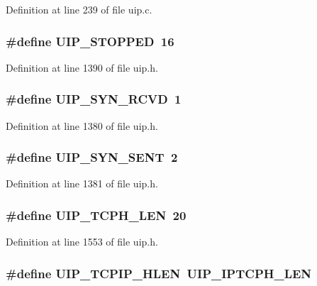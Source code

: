 Definition at line 239 of file uip.c.

\hypertarget{group__uip_gade29ec025e6754afd8cc24c954a8dec8}{
\subsubsection[{UIP\_\-STOPPED}]{\setlength{\rightskip}{0pt plus 5cm}\#define UIP\_\-STOPPED~16}}
\label{group__uip_gade29ec025e6754afd8cc24c954a8dec8}


Definition at line 1390 of file uip.h.

\hypertarget{group__uip_gaa5e3c856b86725125d19fccc34cd9eb5}{
\subsubsection[{UIP\_\-SYN\_\-RCVD}]{\setlength{\rightskip}{0pt plus 5cm}\#define UIP\_\-SYN\_\-RCVD~1}}
\label{group__uip_gaa5e3c856b86725125d19fccc34cd9eb5}


Definition at line 1380 of file uip.h.

\hypertarget{group__uip_ga8af482dec973db57d8b3bd3f69461488}{
\subsubsection[{UIP\_\-SYN\_\-SENT}]{\setlength{\rightskip}{0pt plus 5cm}\#define UIP\_\-SYN\_\-SENT~2}}
\label{group__uip_ga8af482dec973db57d8b3bd3f69461488}


Definition at line 1381 of file uip.h.

\hypertarget{group__uip_ga17d111686f98e4c09db73a770ac3f1a4}{
\subsubsection[{UIP\_\-TCPH\_\-LEN}]{\setlength{\rightskip}{0pt plus 5cm}\#define UIP\_\-TCPH\_\-LEN~20}}
\label{group__uip_ga17d111686f98e4c09db73a770ac3f1a4}


Definition at line 1553 of file uip.h.

\hypertarget{group__uip_gaee37386b2ab828787c05227eb109def7}{
\subsubsection[{UIP\_\-TCPIP\_\-HLEN}]{\setlength{\rightskip}{0pt plus 5cm}\#define UIP\_\-TCPIP\_\-HLEN~UIP\_\-IPTCPH\_\-LEN}}
\label{group__uip_gaee37386b2ab828787c05227eb109def7}


